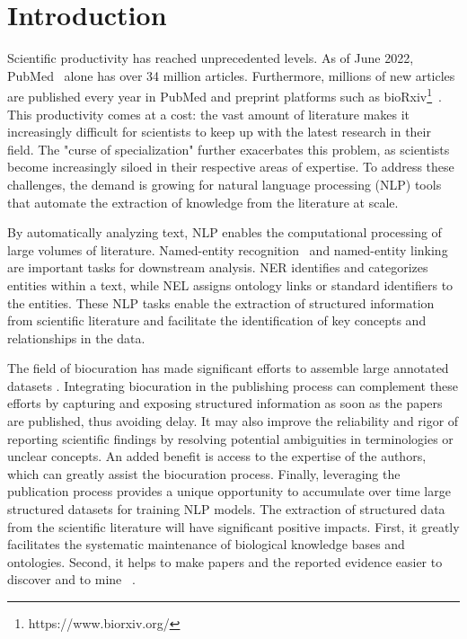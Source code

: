 \documentclass{bioinfo}
\begin{document}
\maketitle

\clearpage

\section{Introduction}

Scientific productivity has reached unprecedented levels. As of June 2022, PubMed~\citep{pubmedhelp} alone has over 34 million articles.  Furthermore, millions of new articles are published every year in PubMed and preprint platforms such as  bioRxiv\footnote{https://www.biorxiv.org/}~\citep{biorxiv}. This productivity comes at a cost: the vast amount of literature makes it increasingly difficult for scientists to keep up with the latest research in their field. The "curse of specialization" further exacerbates this problem, as scientists become increasingly siloed in their respective areas of expertise. To address these challenges, the demand is growing for natural language processing (NLP) tools that automate the extraction of knowledge from the literature at scale.

By automatically analyzing text, NLP enables the computational processing of large volumes of literature. Named-entity recognition~\citep[NER][]{bikel-etal-1997-nymble} and named-entity linking~\citep[NEL][]{hoffart-etal-2011-robust} are important tasks for downstream analysis. NER identifies and categorizes entities within a text, while NEL assigns ontology links or standard identifiers to the entities. These NLP tasks enable the extraction of structured information from scientific literature and facilitate the identification of key concepts and relationships in the data.

The field of biocuration has made significant efforts to assemble large annotated datasets \citep[e.g.,][]{perera,zhao20-biomedical-curation,bigbio}. Integrating biocuration in the publishing process can complement these efforts by capturing and exposing structured information as soon as the papers are published, thus avoiding delay. It may also improve the reliability and rigor of reporting scientific findings by resolving potential ambiguities in terminologies or unclear concepts. An added benefit is access to the expertise of the authors, which can greatly assist the biocuration process.  Finally, leveraging the publication process provides a unique opportunity to accumulate over time large structured datasets for training NLP models. The extraction of structured data from the scientific literature will have significant positive impacts. First, it greatly facilitates the systematic maintenance of biological knowledge bases and ontologies. Second, it helps to make papers and the reported evidence easier to discover and to mine ~\citep{sourcedata}.
\end{document}
